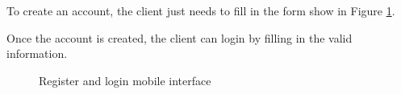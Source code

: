 \documentclass[12pt,a4paper]{report}
\begin{document}
\clearpage
To create an account, the client just needs to fill in the form show in Figure \ref{auth-label}.\par 
Once the account is created, the client can login by filling in the valid information.
\begin{figure}[H]
	\centering
	\vspace*{1in}
	\qquad
	\caption{Register and login mobile interface}%
	\label{auth-label}%
\end{figure}
\clearpage
\end{document}
